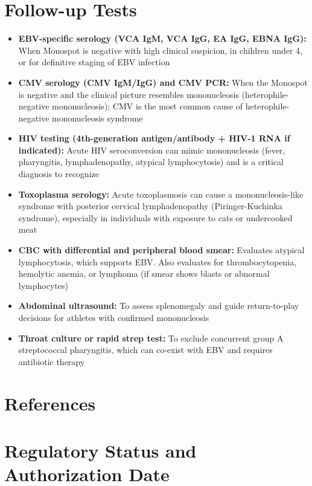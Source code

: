 \section*{Follow-up Tests}
\begin{itemize}
  \item \textbf{EBV-specific serology (VCA IgM, VCA IgG, EA IgG, EBNA IgG):} When Monospot is negative with high clinical suspicion, in children under 4, or for definitive staging of EBV infection
  \item \textbf{CMV serology (CMV IgM/IgG) and CMV PCR:} When the Monospot is negative and the clinical picture resembles mononucleosis (heterophile-negative mononucleosis); CMV is the most common cause of heterophile-negative mononucleosis syndrome
  \item \textbf{HIV testing (4th-generation antigen/antibody + HIV-1 RNA if indicated):} Acute HIV seroconversion can mimic mononucleosis (fever, pharyngitis, lymphadenopathy, atypical lymphocytosis) and is a critical diagnosis to recognize
  \item \textbf{Toxoplasma serology:} Acute toxoplasmosis can cause a mononucleosis-like syndrome with posterior cervical lymphadenopathy (Piringer-Kuchinka syndrome), especially in individuals with exposure to cats or undercooked meat
  \item \textbf{CBC with differential and peripheral blood smear:} Evaluates atypical lymphocytosis, which supports EBV. Also evaluates for thrombocytopenia, hemolytic anemia, or lymphoma (if smear shows blasts or abnormal lymphocytes)
  \item \textbf{Abdominal ultrasound:} To assess splenomegaly and guide return-to-play decisions for athletes with confirmed mononucleosis
  \item \textbf{Throat culture or rapid strep test:} To exclude concurrent group A streptococcal pharyngitis, which can co-exist with EBV and requires antibiotic therapy
\end{itemize}

\section*{References}



\clearpage
\section*{Regulatory Status and Authorization Date}

\clearpage
